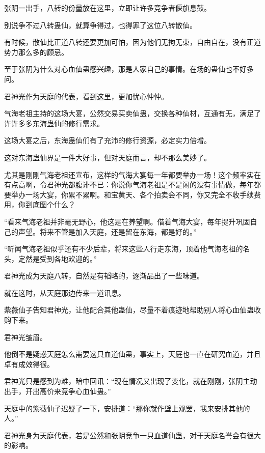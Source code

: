 
\begin{this_body}



张阴一出手，八转的份量放在这里，立即让许多竞争者偃旗息鼓。

别说争不过八转蛊仙，就算争得过，也得罪了这位八转散仙。

有时候，散仙比正道八转还要更加可怕，因为他们无拘无束，自由自在，没有正道势力那么多的顾忌。

至于张阴为什么对心血仙蛊感兴趣，那是人家自己的事情。在场的蛊仙也不好多问。

君神光作为天庭的代表，看到这里，更加忧心忡忡。

气海老祖主持的这场大宴，公然交易买卖仙蛊，交换各种仙材，互通有无，满足了许许多多东海蛊仙的修行需求。

这场大宴之后，东海蛊仙们有了充沛的修行资源，必定实力倍增。

这对东海蛊仙界是一件大好事，但对天庭而言，却不那么美妙了。

尤其是刚刚气海老祖还宣布，这样的气海大宴每一年都要举办一场！这个频率实在有点高啊，令君神光都腹诽不已：你说你气海老祖是不是闲的没有事情做，每年都要举办一场大宴，你累不累啊。和宝黄天、各个拍卖会不同，你又完全不收手续费用，你到底图个什么？

“看来气海老祖并非毫无野心，他这是在养望啊。借着气海大宴，每年提升巩固自己的声望。将来不管是加入天庭，还是留在东海，都是好的。”

“听闻气海老祖似乎还有不少后辈，将来这些人行走东海，顶着他气海老祖的名头，定然是受到各地欢迎的。”

君神光成为天庭八转，自然是有韬略的，逐渐品出了一些味道。

就在这时，从天庭那边传来一道讯息。

紫薇仙子告知君神光，让他配合其他蛊仙，尽量不着痕迹地帮助别人将心血仙蛊收购下来。

君神光皱眉。

他倒不是疑惑天庭怎么需要这只血道仙蛊，事实上，天庭也一直在研究血道，并且卓有成效得很。

君神光只是感到为难，暗中回讯：“现在情况又出现了变化，就在刚刚，张阴主动出手，开出高价来竞争心血仙蛊。”

天庭中的紫薇仙子迟疑了一下，安排道：“那你就作壁上观罢，我来安排其他的人。”

君神光身为天庭代表，若是公然和张阴竞争一只血道仙蛊，对于天庭名誉会有很大的影响。


\end{this_body}
